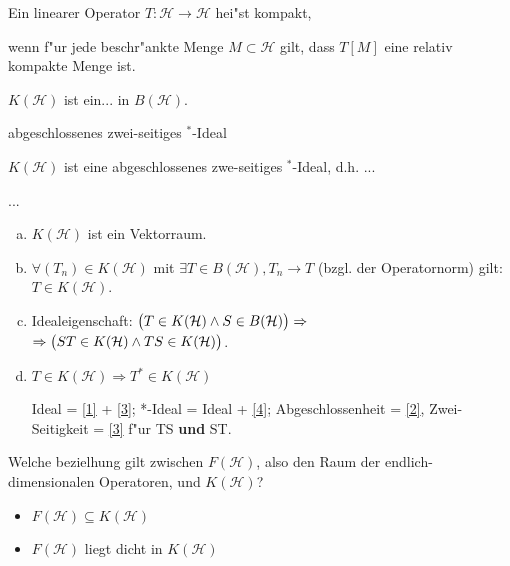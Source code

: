 \documentclass[9pt]{article}
\newcommand{\Hi}{\mathcal{H}}
\newenvironment{field}{}{\newpage}
\newif\ifnote
\newenvironment{note}{\notetrue}{\notefalse}
\newcommand{\localtag}{}
\newcommand{\globaltag}{}
\newcommand{\uuid}{}
\newcommand{\tags}[1]{
    \ifnote 
        \renewcommand{\localtag}{#1}
    \else
        \renewcommand{\globaltag}{#1}
    \fi 
    }
\newcommand{\xplain}[1]{\renewcommand{\uuid}{#1}}
\begin{document}
\begin{note}
	\xplain{22856de0-3411-435a-9a10-a4dbb48ee976}
	\tags{7.1.2}
	
	\begin{field}  %
    	Ein linearer Operator $T: \Hi \rightarrow \Hi$ hei"st kompakt, 
	\end{field}
	
	\begin{field}  %
		wenn f"ur jede beschr"ankte Menge $M\subset\Hi$ gilt, dass
		$T[M]$ eine relativ kompakte Menge ist.
	\end{field}
\end{note}
\begin{note}
\xplain{a0f8c202-a1ca-4741-ac92-5460c7f963c2}
\tags{}

\begin{field}  %
	$K(\Hi)$ ist ein... in $B(\Hi)$.
\end{field}

\begin{field}  %
	abgeschlossenes zwei-seitiges $^*$-Ideal
\end{field}

\begin{field}  %
	$K(\Hi)$ ist eine abgeschlossenes zwe-seitiges $^*$-Ideal, d.h. ...
\end{field}

\begin{field}  %
	...
	\begin{enumerate}[a)]
		\item \label{1} $K(\Hi)$ ist ein Vektorraum.
		\item \label{2} $\forall (T_n) \in K(\Hi)$ mit $\exists T \in B(\Hi), T_n \rightarrow T$ (bzgl. der Operatornorm) gilt: $T\in K(\Hi)$.
		\item \label{3} Idealeigenschaft: $\qty(T\in K(\Hi) \wedge S \in B(\Hi)) \Rightarrow$ \\ 
		\hspace*{90pt}$\Rightarrow\qty(ST \in K(\Hi) \wedge TS \in K(\Hi))$.
		\item \label{4} $T\in K(\Hi) \Rightarrow T^* \in K(\Hi)$
		
		Ideal = \ref{1} + \ref{3}; *-Ideal = Ideal + \ref{4}; Abgeschlossenheit = \ref{2}, Zwei-Seitigkeit = \ref{3} f"ur TS \textbf{und} ST.
	\end{enumerate}	
\end{field}
	
\begin{field}  %
	Welche bezielhung gilt zwischen $F(\Hi)$, also den Raum der endlich-dimensionalen Operatoren, und $K(\Hi)$?
\end{field}

\begin{field}  %
	\begin{itemize}
		\item $F(\Hi) \subseteq K(\Hi)$
		\item $F(\Hi)$ liegt dicht in $K(\Hi)$
	\end{itemize}
\end{field}
\end{note}
\end{document}
